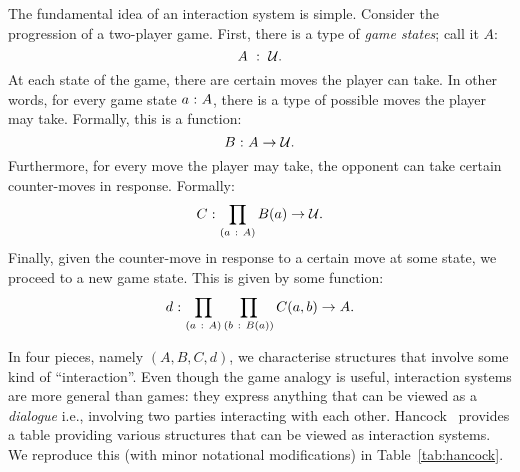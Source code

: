 The fundamental idea of an interaction system is simple. Consider the progression of a
two-player game. First, there is a type of \emph{game states}; call it $A$:
\begin{equation*}
  A~:~\mathcal{U}.
\end{equation*}
At each state of the game, there are certain moves the player can take. In other words,
for every game state $a\hspace{0.1mm}:\hspace{0.1mm}A$, there is a type of possible moves the player may take.
Formally, this is a function:
\begin{equation*}
  B\hspace{0.1mm}:\hspace{0.1mm}A \rightarrow \mathcal{U}.
\end{equation*}
Furthermore, for every move the player may take, the opponent can take certain
counter-moves in response. Formally:
\begin{equation*}
  C\hspace{0.1mm}:\hspace{0.1mm}\prod_{(a~:~A)} B(a) \rightarrow \mathcal{U}.
\end{equation*}
Finally, given the counter-move in response to a certain move at some state, we proceed to
a new game state. This is given by some function:
\begin{equation*}
  d\hspace{0.1mm}:\hspace{0.1mm}\prod_{(a~:~A)} \prod_{(b~:~B(a))} C(a, b) \rightarrow A.
\end{equation*}

In four pieces, namely $(A, B, C, d)$, we characterise structures that involve some kind
of ``interaction''. Even though the game analogy is useful, interaction systems are more
general than games: they express anything that can be viewed as a \emph{dialogue} i.e.,
involving two parties interacting with each other.
Hancock~\cite{hancock-interaction-systems} provides a table providing various structures
that can be viewed as interaction systems. We reproduce this (with minor notational
modifications) in Table~\ref{tab:hancock}.

